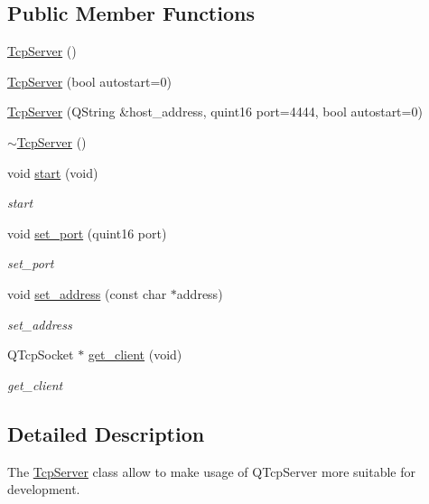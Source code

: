 \subsection*{Public Member Functions}
\begin{DoxyCompactItemize}
\item 
\mbox{\hyperlink{class_tcp_server_abc977059ef61f1c42f5fda1bc5945ab0}{Tcp\+Server}} ()
\item 
\mbox{\hyperlink{class_tcp_server_af43d51237b45ebb729911d829dfa7856}{Tcp\+Server}} (bool autostart=0)
\item 
\mbox{\hyperlink{class_tcp_server_a5242d1465353dd6e57bf556416021598}{Tcp\+Server}} (Q\+String \&host\+\_\+address, quint16 port=4444, bool autostart=0)
\item 
\mbox{\hyperlink{class_tcp_server_a728a9e31c53cf86887f1f6149b1c46dd}{$\sim$\+Tcp\+Server}} ()
\item 
void \mbox{\hyperlink{class_tcp_server_ab9a387d38fd311ae853b4b4006504096}{start}} (void)
\begin{DoxyCompactList}\small\item\em start \end{DoxyCompactList}\item 
void \mbox{\hyperlink{class_tcp_server_aaf6005b12641ab81bcf91099d9255437}{set\+\_\+port}} (quint16 port)
\begin{DoxyCompactList}\small\item\em set\+\_\+port \end{DoxyCompactList}\item 
void \mbox{\hyperlink{class_tcp_server_a3496c0dfa5e3c1cb5bf794739508eda4}{set\+\_\+address}} (const char $\ast$address)
\begin{DoxyCompactList}\small\item\em set\+\_\+address \end{DoxyCompactList}\item 
Q\+Tcp\+Socket $\ast$ \mbox{\hyperlink{class_tcp_server_a321f1064fd590efdeb1f9458b89afdca}{get\+\_\+client}} (void)
\begin{DoxyCompactList}\small\item\em get\+\_\+client \end{DoxyCompactList}\end{DoxyCompactItemize}


\subsection{Detailed Description}
The \mbox{\hyperlink{class_tcp_server}{Tcp\+Server}} class allow to make usage of Q\+Tcp\+Server more suitable for development. 

